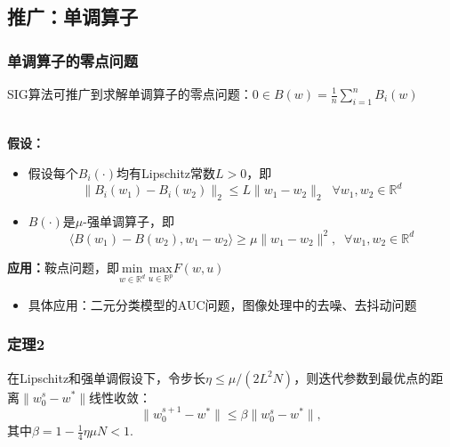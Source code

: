 \subsection{推广：单调算子}
  \frame
  {
    \frametitle{单调算子的零点问题}
    \footnotesize
    SIG算法可推广到求解单调算子的零点问题：$0 \in B(w) = \frac{1}{n}\sum_{i=1}^n B_i(w)$ \\~\\

    \pause

    \textbf{假设：}
    \begin{itemize}
        \item 假设每个$B_i(\cdot)$均有Lipschitz常数$L > 0$，即
        $$
        \| B_i(w_1) - B_i(w_2) \|_2 \le L \| w_1 - w_2 \|_2 \;\; \forall w_1, w_2 \in \mathbb{R}^d
        $$
        \item $B(\cdot)$是$\mu$-强单调算子，即
        $$
        \langle B(w_1) - B(w_2), w_1 - w_2 \rangle \ge \mu \| w_1 - w_2 \|^2, \;\; \forall w_1, w_2 \in \mathbb{R}^d
        $$
    \end{itemize}

    \pause
    \begin{block}{}
    \textbf{应用：}鞍点问题，即$\underset{w \in \mathbb{R}^d}{\text{min}} \ \underset{u \in \mathbb{R}^p}{\text{max}} F(w, u)$
    \begin{itemize}
        \item 具体应用：二元分类模型的AUC问题，图像处理中的去噪、去抖动问题
    \end{itemize}
    \end{block}
  }

  \frame
  {
    \frametitle{定理2}
    \begin{block}{}
    在Lipschitz和强单调假设下，令步长$\eta \le \mu/(2L^2N)$，则迭代参数到最优点的距离$\|w_0^s - w^*\|$线性收敛：
    $$
    \| w_0^{s+1} - w^* \| \le \beta \| w_0^{s} - w^* \|,
    $$
    其中$\beta = 1 - \frac{1}{4} \eta \mu N < 1$.
    \end{block}
  }
